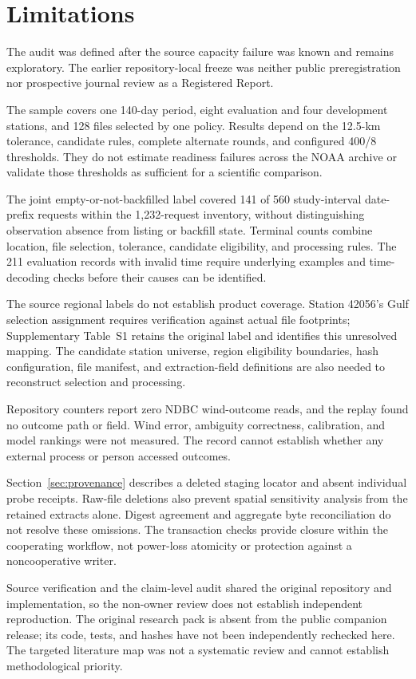 \section{Limitations}
\label{sec:limitations}

The audit was defined after the source capacity failure was known and remains exploratory. The earlier repository-local freeze was neither public preregistration nor prospective journal review as a Registered Report.

The sample covers one 140-day period, eight evaluation and four development stations, and 128 files selected by one policy. Results depend on the 12.5-km tolerance, candidate rules, complete alternate rounds, and configured 400/8 thresholds. They do not estimate readiness failures across the NOAA archive or validate those thresholds as sufficient for a scientific comparison.

The joint empty-or-not-backfilled label covered 141 of 560 study-interval date-prefix requests within the 1,232-request inventory, without distinguishing observation absence from listing or backfill state. Terminal counts combine location, file selection, tolerance, candidate eligibility, and processing rules. The 211 evaluation records with invalid time require underlying examples and time-decoding checks before their causes can be identified.

The source regional labels do not establish product coverage. Station 42056's Gulf selection assignment requires verification against actual file footprints; Supplementary Table~S1 retains the original label and identifies this unresolved mapping. The candidate station universe, region eligibility boundaries, hash configuration, file manifest, and extraction-field definitions are also needed to reconstruct selection and processing.

Repository counters report zero NDBC wind-outcome reads, and the replay found no outcome path or field. Wind error, ambiguity correctness, calibration, and model rankings were not measured. The record cannot establish whether any external process or person accessed outcomes.

Section~\ref{sec:provenance} describes a deleted staging locator and absent individual probe receipts. Raw-file deletions also prevent spatial sensitivity analysis from the retained extracts alone. Digest agreement and aggregate byte reconciliation do not resolve these omissions. The transaction checks provide closure within the cooperating workflow, not power-loss atomicity or protection against a noncooperative writer.

Source verification and the claim-level audit shared the original repository and implementation, so the non-owner review does not establish independent reproduction. The original research pack is absent from the public companion release; its code, tests, and hashes have not been independently rechecked here. The targeted literature map was not a systematic review and cannot establish methodological priority.
